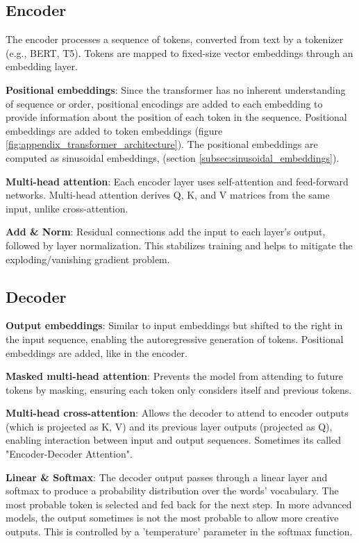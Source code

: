 \subsection*{Encoder}

The encoder processes a sequence of tokens, converted from text by a tokenizer (e.g., BERT, T5). Tokens are mapped to fixed-size vector embeddings through an embedding layer.

\textbf{Positional embeddings}: Since the transformer has no inherent understanding of sequence or order, positional encodings are added to each embedding to provide information about the position of each token in the sequence. Positional embeddings are added to token embeddings (figure \ref{fig:appendix_transformer_architecture}). The positional embeddings are computed as sinusoidal embeddings, (section \ref{subsec:sinusoidal_embeddings}).

\textbf{Multi-head attention}: Each encoder layer uses self-attention and feed-forward networks. Multi-head attention derives Q, K, and V matrices from the same input, unlike cross-attention.

\textbf{Add \& Norm}: Residual connections add the input to each layer's output, followed by layer normalization. This stabilizes training and helps to mitigate the exploding/vanishing gradient problem.









\subsection*{Decoder}

\textbf{Output embeddings}: Similar to input embeddings but shifted to the right in the input sequence, enabling the autoregressive generation of tokens. Positional embeddings are added, like in the encoder.

\textbf{Masked multi-head attention}: Prevents the model from attending to future tokens by masking, ensuring each token only considers itself and previous tokens.

\textbf{Multi-head cross-attention}: Allows the decoder to attend to encoder outputs (which is projected as K, V) and its previous layer outputs (projected as Q), enabling interaction between input and output sequences. Sometimes its called "Encoder-Decoder Attention".

\textbf{Linear \& Softmax}: The decoder output passes through a linear layer and softmax to produce a probability distribution over the words' vocabulary. The most probable token is selected and fed back for the next step. In more advanced models, the output sometimes is not the most probable to allow more creative outputs. This is controlled by a 'temperature' parameter in the softmax function.

